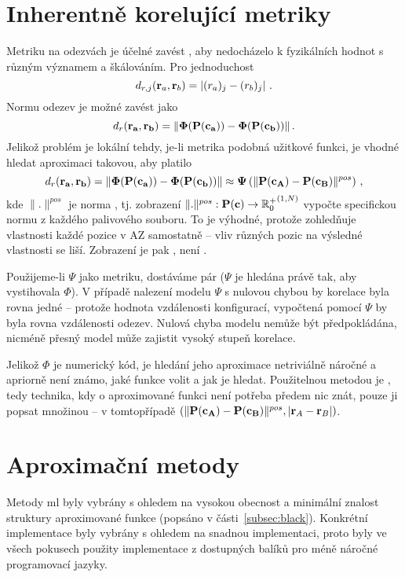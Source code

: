 \section{Inherentně korelující metriky} %
Metriku na odezvách je účelné zavést , aby nedocházelo k  fyzikálních hodnot s různým významem a škálováním. Pro jednoduchost 
\begin{equation}
	d_{r,j} (\mathbf{r}_a, \mathbf{r}_b)= \left| (r_a)_j - (r_b)_j \right|\,.
\end{equation}
Normu odezev je možné zavést jako
\begin{equation}
	d_r (\mathbf{r_a}, \mathbf{r_b}) = \|\mathbf{\Phi(P(c_a))}-\mathbf{\Phi(P(c_b))}\|\,.
\end{equation}
Jelikož problém je lokální tehdy, je-li metrika podobná užitkové funkci, je vhodné hledat aproximaci takovou, aby platilo 
\begin{equation}
	d_r (\mathbf{r_a}, \mathbf{r_b}) = \|\mathbf{\Phi(P(c_a))}-\mathbf{\Phi(P(c_b))}\| \approx \mathbf{\Psi} \left( \| \mathbf{P(c_A)} - \mathbf{P(c_B)}\|^{pos}\right)\,,
\end{equation}
kde $\|.\|^{pos}$ je norma , tj. zobrazení $\|.\|^{pos}: \mathbf{P(c)} \rightarrow {\mathbb{R}_0^{+}}^{(1,N)}$ vypočte specifickou normu 
z každého palivového souboru. To je výhodné, protože zohledňuje vlastnosti každé pozice v AZ samostatně -- vliv různých pozic na výsledné vlastnosti 
se liší. Zobrazení je pak , není . 

Použijeme-li $\Psi$ jako metriku, dostáváme pár  ($\Psi$ je hledána právě tak, aby vystihovala $\Phi$). 
V případě nalezení modelu $\Psi$ s nulovou chybou by korelace byla rovna jedné -- protože hodnota vzdálenosti konfigurací, vypočtená pomocí 
$\Psi$ by byla rovna vzdálenosti odezev. Nulová chyba modelu nemůže být předpokládána, nicméně přesný model může zajistit vysoký stupeň korelace. 

Jelikož $\Phi$ je numerický kód, je hledání jeho aproximace netriviálně náročné a apriorně není známo, jaké funkce volit a jak je hledat. 
Použitelnou metodou je , tedy technika, kdy o aproximované funkci není potřeba předem nic znát, pouze ji popsat 
množinou  -- v tomto\newline případě $\left( \|\mathbf{P(c_A)} - \mathbf{P(c_B)}\|^{pos}, |\mathbf{r}_A - \mathbf{r}_B| \right)$.

\section{Aproximační metody}
Metody \ac{ml} byly vybrány s ohledem na vysokou obecnost a minimální znalost struktury aproximované funkce (popsáno v části~\ref{subsec:black}). 
Konkrétní implementace byly vybrány s ohledem na snadnou implementaci, proto byly ve všech pokusech použity implementace z dostupných balíků pro 
méně náročné programovací jazyky. 

